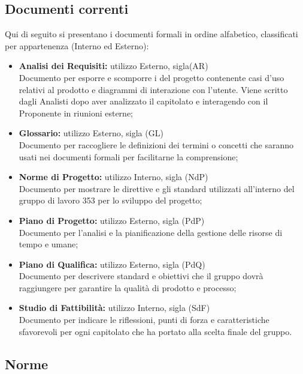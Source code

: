 \documentclass[NormeDiProgetto.tex]{subfiles}
\begin{document}
	\subsection{Documenti correnti}
	Qui di seguito si presentano i documenti formali in ordine alfabetico, classificati per appartenenza (Interno ed Esterno):
	\begin{itemize}
		\item \textbf{Analisi dei Requisiti:} utilizzo Esterno, sigla(AR) \\
		 Documento per esporre e scomporre i  del progetto contenente casi d'uso relativi al prodotto e diagrammi di interazione con l'utente. Viene scritto dagli Analisti dopo aver analizzato il capitolato e interagendo con il Proponente in riunioni esterne;
		
		\item \textbf{Glossario:}
		utilizzo Esterno, sigla (GL) \\
		Documento per raccogliere le definizioni dei termini o concetti che saranno usati nei documenti formali per facilitarne la comprensione;
		
		\item \textbf{Norme di Progetto:}
		utilizzo Interno, sigla (NdP) \\
		Documento per mostrare le direttive e gli standard utilizzati all'interno del gruppo di lavoro 353
		per lo sviluppo del progetto;
		
		\item \textbf{Piano di Progetto:}
		utilizzo Esterno, sigla (PdP) \\
		Documento per l'analisi e la pianificazione della gestione delle risorse di tempo e umane;
		
		\item \textbf{Piano di Qualifica:}
		utilizzo Esterno, sigla (PdQ) \\
		Documento per descrivere standard e obiettivi che il gruppo dovrà raggiungere per garantire la qualità di prodotto e processo;
		
		\item \textbf{Studio di Fattibilità:}
		utilizzo Interno, sigla (SdF) \\
		Documento per indicare le riflessioni, punti di forza e caratteristiche sfavorevoli per ogni capitolato che ha portato alla scelta finale del gruppo.
		
	\end{itemize}
	
	\subsection{Norme}
\end{document}
